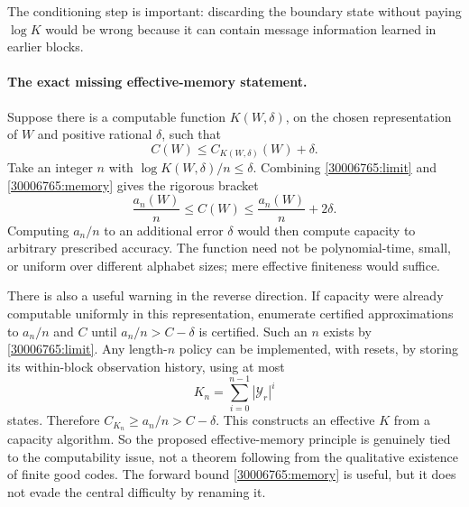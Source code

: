 \documentclass[11pt,a4paper]{article}
\numberwithin{equation}{section}
\begin{document}
The conditioning step is important: discarding the boundary state
without paying $\log K$ would be wrong because it can contain message
information learned in earlier blocks.

\paragraph{The exact missing effective-memory statement.}
Suppose there is a computable function $K(W,\delta)$, on the chosen
representation of $W$ and positive rational $\delta$, such that
\begin{equation}\label{30006765:modulus}
 C(W)\leq C_{K(W,\delta)}(W)+\delta.
\end{equation}
Take an integer $n$ with $\log K(W,\delta)/n\leq\delta$. Combining
\eqref{30006765:limit} and \eqref{30006765:memory} gives the rigorous bracket
\begin{equation}
 \frac{a_n(W)}n\leq C(W)
 \leq\frac{a_n(W)}n+2\delta.
\end{equation}
Computing $a_n/n$ to an additional error $\delta$ would then compute
capacity to arbitrary prescribed accuracy. The function need not be
polynomial-time, small, or uniform over different alphabet sizes; mere
effective finiteness would suffice.

There is also a useful warning in the reverse direction. If capacity
were already computable uniformly in this representation, enumerate
certified approximations to $a_n/n$ and $C$ until
$a_n/n>C-\delta$ is certified. Such an $n$ exists by
\eqref{30006765:limit}. Any length-$n$ policy can be implemented, with resets,
by storing its within-block observation history, using at most
\begin{equation}
 K_n=\sum_{i=0}^{n-1}|\mathcal Y_r|^i
\end{equation}
states. Therefore $C_{K_n}\geq a_n/n>C-\delta$. This constructs an
effective $K$ from a capacity algorithm. So the proposed effective-memory
principle is genuinely tied to the computability issue, not a theorem
following from the qualitative existence of finite good codes. The
forward bound \eqref{30006765:memory} is useful, but it does not evade the
central difficulty by renaming it.
\end{document}
